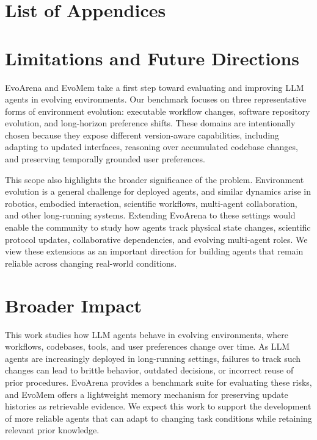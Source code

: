 \documentclass{llmxive}
\begin{document}
\appendix

\startcontents[appendix]

\section*{List of Appendices}


\section{Limitations and Future Directions}
\label{sec:scope_future}

EvoArena and EvoMem take a first step toward evaluating and improving LLM agents in evolving environments. Our benchmark focuses on three representative forms of environment evolution: executable workflow changes, software repository evolution, and long-horizon preference shifts. These domains are intentionally chosen because they expose different version-aware capabilities, including adapting to updated interfaces, reasoning over accumulated codebase changes, and preserving temporally grounded user preferences.

This scope also highlights the broader significance of the problem. Environment evolution is a general challenge for deployed agents, and similar dynamics arise in robotics, embodied interaction, scientific workflows, multi-agent collaboration, and other long-running systems. Extending EvoArena to these settings would enable the community to study how agents track physical state changes, scientific protocol updates, collaborative dependencies, and evolving multi-agent roles. We view these extensions as an important direction for building agents that remain reliable across changing real-world conditions.

\section{Broader Impact}
\label{app:broader_impact}

This work studies how LLM agents behave in evolving environments, where workflows, codebases, tools, and user preferences change over time. As LLM agents are increasingly deployed in long-running settings, failures to track such changes can lead to brittle behavior, outdated decisions, or incorrect reuse of prior procedures. EvoArena provides a benchmark suite for evaluating these risks, and EvoMem offers a lightweight memory mechanism for preserving update histories as retrievable evidence. We expect this work to support the development of more reliable agents that can adapt to changing task conditions while retaining relevant prior knowledge.
\end{document}

